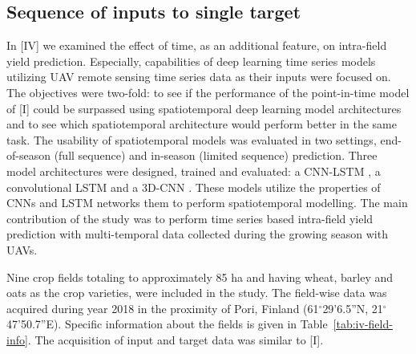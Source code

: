 \subsection{Sequence of inputs to single target}
\label{subsec:sequence-input-results}

In [IV] we examined the effect of time, as an additional feature, on intra-field yield prediction. Especially, capabilities of deep learning time series models utilizing UAV remote sensing time series data as their inputs were focused on. The objectives were two-fold: to see if the performance of the point-in-time model of [I] could be surpassed using spatiotemporal deep learning model architectures and to see which spatiotemporal architecture would perform better in the same task. The usability of spatiotemporal models was evaluated in two settings, end-of-season (full sequence) and in-season (limited sequence) prediction. Three model architectures were designed, trained and evaluated: a CNN-LSTM \cite{Sainath2015}, a convolutional LSTM \cite{Shi2015a} and a 3D-CNN \cite{Tran2015}. These models utilize the properties of CNNs and LSTM networks them to perform spatiotemporal modelling. The main contribution of the study was to perform time series based intra-field yield prediction with multi-temporal data collected during the growing season with UAVs.

Nine crop fields totaling to approximately 85 ha and having wheat, barley and oats as the crop varieties, were included in the study. The field-wise data was acquired during year 2018 in the proximity of Pori, Finland (61$^\circ$29'6.5''N, 21$^\circ$47'50.7''E). Specific information about the fields is given in Table~\ref{tab:iv-field-info}. The acquisition of input and target data was similar to [I]. 

